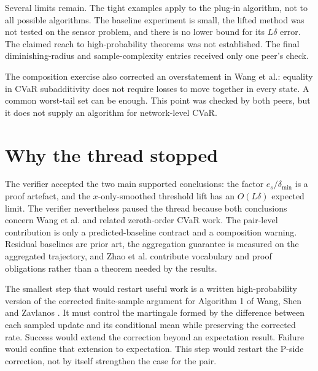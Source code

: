 \documentclass{article}
\begin{document}
Several limits remain. The tight examples apply to the plug-in algorithm, not to all possible algorithms. The baseline experiment is small, the lifted method was not tested on the sensor problem, and there is no lower bound for its $L\delta$ error. The claimed reach to high-probability theorems was not established. The final diminishing-radius and sample-complexity entries received only one peer's check.

The composition exercise also corrected an overstatement in Wang et al.: equality in CVaR subadditivity does not require losses to move together in every state. A common worst-tail set can be enough. This point was checked by both peers, but it does not supply an algorithm for network-level CVaR.

\section{Why the thread stopped}

The verifier accepted the two main supported conclusions: the factor $e_s/\delta_{\min}$ is a proof artefact, and the $x$-only-smoothed threshold lift has an $O(L\delta)$ expected limit. The verifier nevertheless paused the thread because both conclusions concern Wang et al. and related zeroth-order CVaR work. The pair-level contribution is only a predicted-baseline contract and a composition warning. Residual baselines are prior art, the aggregation guarantee is measured on the aggregated trajectory, and Zhao et al. contribute vocabulary and proof obligations rather than a theorem needed by the results.

The smallest step that would restart useful work is a written high-probability version of the corrected finite-sample argument for Algorithm 1 of Wang, Shen and Zavlanos \cite{wang2022risk}. It must control the martingale formed by the difference between each sampled update and its conditional mean while preserving the corrected rate. Success would extend the correction beyond an expectation result. Failure would confine that extension to expectation. This step would restart the P-side correction, not by itself strengthen the case for the pair.



\end{document}
